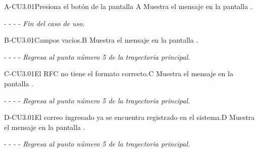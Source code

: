 	
	

	
	

	\begin{UCtrayectoriaA}{A-CU3.01}{Presiona el botón  de la pantalla }{A}
		\UCpaso[\UCsist] Muestra el mensaje  en la pantalla .
		\item[- -] - - {\em Fin del caso de uso.} 
	\end{UCtrayectoriaA}

	\begin{UCtrayectoriaA}{B-CU3.01}{Campos vacíos.}{B}
	    \UCpaso[\UCsist]Muestra el mensaje en la pantalla .
	    \item[- -] - - {\em Regresa al punto número 5 de la trayectoria principal.}
	\end{UCtrayectoriaA}

    

	\begin{UCtrayectoriaA}{C-CU3.01}{El RFC no tiene el formato correcto.}{C}
			\UCpaso[\UCsist] Muestra el mensaje  en la pantalla .
			\item[- -] - - {\em Regresa al punto número 5 de la trayectoria principal.} 
    \end{UCtrayectoriaA}
    

	\begin{UCtrayectoriaA}{D-CU3.01}{El correo ingresado ya se encuentra registrado en el sistema.}{D}
		\UCpaso[\UCsist] Muestra el mensaje  en la pantalla .
		\item[- -] - - {\em Regresa al punto número 5 de la trayectoria principal.} 
	\end{UCtrayectoriaA}	


